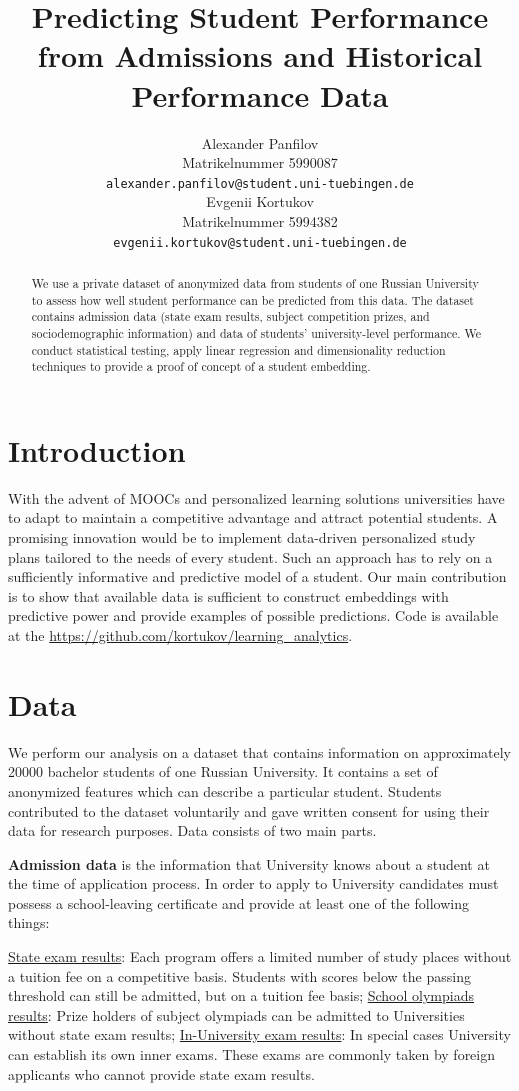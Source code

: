 \documentclass{article}
\title{Predicting Student Performance\\ from Admissions and Historical Performance Data}
\author{%
  Alexander Panfilov\\
  Matrikelnummer 5990087\\
  \texttt{alexander.panfilov@student.uni-tuebingen.de} \\
  \And
  Evgenii Kortukov\\
  Matrikelnummer 5994382\\
  \texttt{evgenii.kortukov@student.uni-tuebingen.de} \\
}
\begin{document}
\maketitle

\begin{abstract}
  We use a private dataset of anonymized data from students of
  one Russian University to assess how well student performance can be
  predicted from this data. The dataset contains admission data (state exam results, subject competition prizes, and sociodemographic
  information) and data of students’ university-level performance. We conduct statistical testing, apply linear
  regression and dimensionality reduction techniques to provide a proof of concept of a student embedding.
\end{abstract}

\section{Introduction}
\label{sec:intro}
With the advent of MOOCs and personalized learning solutions universities have to adapt to maintain a competitive advantage and attract potential students. A promising innovation would be to implement data-driven personalized study plans tailored to the needs of every student. Such an approach has to rely on a sufficiently informative and predictive model of a student. Our main contribution is to show that available data is sufficient to construct embeddings with predictive power and provide examples of possible predictions. Code is available at the \url{https://github.com/kortukov/learning_analytics}.

\section{Data}
\label{sec:data}
We perform our analysis on a dataset that contains information on approximately 20000 bachelor students of one Russian University. It contains a set of anonymized features which can describe a particular student. Students contributed to the dataset voluntarily and gave written consent for using their data for research purposes. Data consists of two main parts.

\textbf{Admission data} is the information that University knows about a student at the time of application process. In order to apply to University candidates must possess a school-leaving certificate and provide at least one of the following things:

\underline{State exam results}: Each program offers a limited number of study places without a tuition fee on a competitive basis. Students with scores below the passing threshold can still be admitted, but on a tuition fee basis;
\underline{School olympiads results}: Prize holders of subject olympiads can be admitted to Universities without state exam results;
\underline{In-University exam results}: In special cases University can establish its own inner exams. These exams are commonly taken by foreign applicants who cannot provide state exam results.
\end{document}
